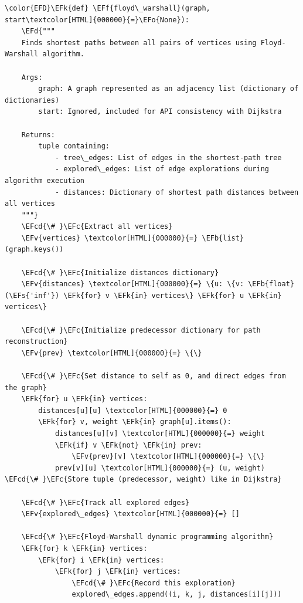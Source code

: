 \documentclass[a4paper,12pt]{article}
\newcommand{\EFc}[1]{\textcolor{EFc}{#1}} %
\newcommand{\EFcd}[1]{\textcolor{EFcd}{#1}} %
\newcommand{\EFs}[1]{\textcolor{EFs}{#1}} %
\newcommand{\EFd}[1]{\textcolor{EFd}{#1}} %
\newcommand{\EFk}[1]{\textcolor{EFk}{#1}} %
\newcommand{\EFb}[1]{\textcolor{EFb}{#1}} %
\newcommand{\EFf}[1]{\textcolor{EFf}{#1}} %
\newcommand{\EFv}[1]{\textcolor{EFv}{#1}} %
\newcommand{\EFo}[1]{\textcolor{EFo}{#1}} %
\begin{document}
\begin{listing}[htbp]
\begin{Code}
\begin{Verbatim}
\color{EFD}\EFk{def} \EFf{floyd\_warshall}(graph, start\textcolor[HTML]{000000}{=}\EFo{None}):
    \EFd{"""
    Finds shortest paths between all pairs of vertices using Floyd-Warshall algorithm.

    Args:
        graph: A graph represented as an adjacency list (dictionary of dictionaries)
        start: Ignored, included for API consistency with Dijkstra

    Returns:
        tuple containing:
            - tree\_edges: List of edges in the shortest-path tree
            - explored\_edges: List of edge explorations during algorithm execution
            - distances: Dictionary of shortest path distances between all vertices
    """}
    \EFcd{\# }\EFc{Extract all vertices}
    \EFv{vertices} \textcolor[HTML]{000000}{=} \EFb{list}(graph.keys())

    \EFcd{\# }\EFc{Initialize distances dictionary}
    \EFv{distances} \textcolor[HTML]{000000}{=} \{u: \{v: \EFb{float}(\EFs{'inf'}) \EFk{for} v \EFk{in} vertices\} \EFk{for} u \EFk{in} vertices\}

    \EFcd{\# }\EFc{Initialize predecessor dictionary for path reconstruction}
    \EFv{prev} \textcolor[HTML]{000000}{=} \{\}

    \EFcd{\# }\EFc{Set distance to self as 0, and direct edges from the graph}
    \EFk{for} u \EFk{in} vertices:
        distances[u][u] \textcolor[HTML]{000000}{=} 0
        \EFk{for} v, weight \EFk{in} graph[u].items():
            distances[u][v] \textcolor[HTML]{000000}{=} weight
            \EFk{if} v \EFk{not} \EFk{in} prev:
                \EFv{prev}[v] \textcolor[HTML]{000000}{=} \{\}
            prev[v][u] \textcolor[HTML]{000000}{=} (u, weight)  \EFcd{\# }\EFc{Store tuple (predecessor, weight) like in Dijkstra}

    \EFcd{\# }\EFc{Track all explored edges}
    \EFv{explored\_edges} \textcolor[HTML]{000000}{=} []

    \EFcd{\# }\EFc{Floyd-Warshall dynamic programming algorithm}
    \EFk{for} k \EFk{in} vertices:
        \EFk{for} i \EFk{in} vertices:
            \EFk{for} j \EFk{in} vertices:
                \EFcd{\# }\EFc{Record this exploration}
                explored\_edges.append((i, k, j, distances[i][j]))


\end{Verbatim}
\end{Code}
\end{listing}
\end{document}
